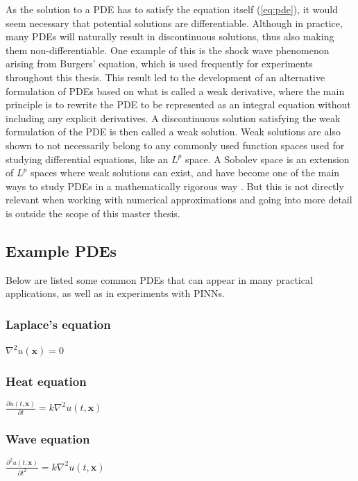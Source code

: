 As the solution to a PDE has to satisfy the equation itself (\ref{eq:pde}), it would seem necessary that potential solutions are differentiable. Although in practice, many PDEs will naturally result in discontinuous solutions, thus also making them non-differentiable. One example of this is the shock wave phenomenon arising from Burgers' equation, which is used frequently for experiments throughout this thesis. This result led to the development of an alternative formulation of PDEs based on what is called a weak derivative, where the main principle is to rewrite the PDE to be represented as an integral equation without including any explicit derivatives. A discontinuous solution satisfying the weak formulation of the PDE is then called a weak solution. Weak solutions are also shown to not necessarily belong to any commonly used function spaces used for studying differential equations, like an $L^p$ space. A Sobolev space is an extension of $L^p$ spaces where weak solutions can exist, and have become one of the main ways to study PDEs in a mathematically rigorous way \cite{pdebook}. But this is not directly relevant when working with numerical approximations and going into more detail is outside the scope of this master thesis.

\subsection{Example PDEs}

Below are listed some common PDEs that can appear in many practical applications, as well as in experiments with PINNs.

\subsubsection*{Laplace's equation} 

$\nabla^2 u(\bm{x}) = 0$

\subsubsection*{Heat equation}

$\frac{\partial u(t, \bm{x})}{\partial t} = k \nabla^2 u(t, \bm{x})$

\subsubsection*{Wave equation}

$\frac{\partial^2 u(t, \bm{x})}{\partial t^2} = k \nabla^2 u(t, \bm{x})$

